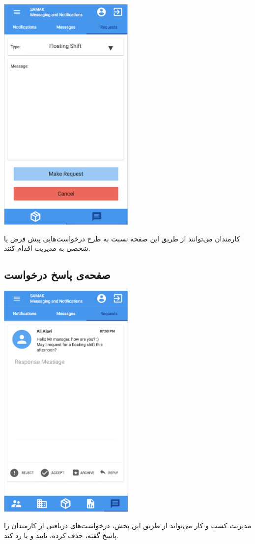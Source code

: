 \begin{center}
\includegraphics[width = 0.5\textwidth]{images/21-make-request.png}
\end{center}

کارمندان می‌توانند از طریق این صفحه نسبت به طرح درخواست‌هایی پیش فرض یا شخصی به مدیریت اقدام کنند.


\subsection{صفحه‌ی پاسخ درخواست}

\begin{center}
\includegraphics[width = 0.5\textwidth]{images/22-answer-request.png}
\end{center}

مدیریت کسب و کار می‌تواند از طریق این بخش‌، درخواست‌های دریافتی از کارمندان را پاسخ گفته، حذف کرده، تایید و یا رد کند.



